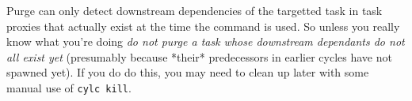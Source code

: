 Purge can only detect downstream dependencies of the targetted task in
task proxies that actually exist at the time the command is used. So
unless you really know what you're doing {\em do not purge a task whose
downstream dependants do not all exist yet} (presumably because *their*
predecessors in earlier cycles have not spawned yet).  If you do do
this, you may need to clean up later with some manual use of 
\lstinline=cylc kill=.
